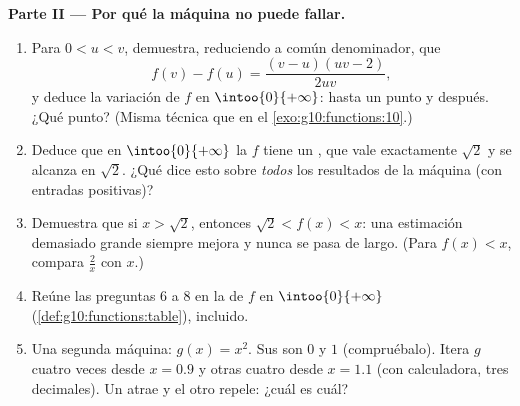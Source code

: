 \begin{problem}
\medskip
\noindent\textbf{Parte II --- Por qué la máquina no puede fallar.}
\begin{enumerate}[resume]
  \item Para $0 < u < v$, demuestra, reduciendo a común denominador, que
        \[
        f(v) - f(u) = \frac{(v - u)(uv - 2)}{2uv} ,
        \]
        y deduce la variación de $f$ en $\intoo{0}{+\infty}$: 
        hasta un punto y  después. ¿Qué punto? (Misma técnica
        que en el \cref{exo:g10:functions:10}.)
  \item Deduce que en $\intoo{0}{+\infty}$ la  $f$ tiene un ,
        que vale exactamente $\sqrt2$ y se alcanza en $\sqrt2$. ¿Qué dice
        esto sobre \emph{todos} los resultados de la máquina (con entradas
        positivas)?
  \item Demuestra que si $x > \sqrt2$, entonces $\sqrt2 < f(x) < x$: una
        estimación demasiado grande siempre mejora y nunca se pasa de
        largo. (Para $f(x) < x$, compara $\frac2x$ con $x$.)
  \item Reúne las preguntas 6 a 8 en la  de $f$ en
        $\intoo{0}{+\infty}$ (\cref{def:g10:functions:table}), 
        incluido.
  \item Una segunda máquina: $g(x) = x^2$. Sus  son $0$ y $1$
        (compruébalo). Itera $g$ cuatro veces desde $x = 0.9$ y otras
        cuatro desde $x = 1.1$ (con calculadora, tres decimales). Un  atrae y el otro repele: ¿cuál es cuál?
\end{enumerate}


\end{problem}

